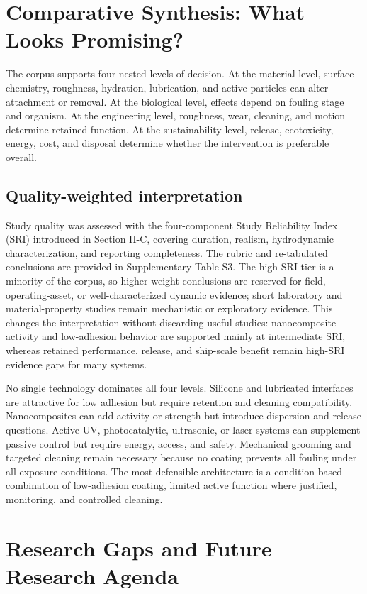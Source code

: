 \section{Comparative Synthesis: What Looks Promising?}
The corpus supports four nested levels of decision. At the material level, surface chemistry, roughness, hydration, lubrication, and active particles can alter attachment or removal. At the biological level, effects depend on fouling stage and organism. At the engineering level, roughness, wear, cleaning, and motion determine retained function. At the sustainability level, release, ecotoxicity, energy, cost, and disposal determine whether the intervention is preferable overall.

\subsection{Quality-weighted interpretation}
Study quality was assessed with the four-component Study Reliability Index (SRI) introduced in Section II-C, covering duration, realism, hydrodynamic characterization, and reporting completeness. The rubric and re-tabulated conclusions are provided in Supplementary Table S3. The high-SRI tier is a minority of the corpus, so higher-weight conclusions are reserved for field, operating-asset, or well-characterized dynamic evidence; short laboratory and material-property studies remain mechanistic or exploratory evidence. This changes the interpretation without discarding useful studies: nanocomposite activity and low-adhesion behavior are supported mainly at intermediate SRI, whereas retained performance, release, and ship-scale benefit remain high-SRI evidence gaps for many systems.

No single technology dominates all four levels. Silicone and lubricated interfaces are attractive for low adhesion but require retention and cleaning compatibility. Nanocomposites can add activity or strength but introduce dispersion and release questions. Active UV, photocatalytic, ultrasonic, or laser systems can supplement passive control but require energy, access, and safety. Mechanical grooming and targeted cleaning remain necessary because no coating prevents all fouling under all exposure conditions. The most defensible architecture is a condition-based combination of low-adhesion coating, limited active function where justified, monitoring, and controlled cleaning.

\section{Research Gaps and Future Research Agenda}
